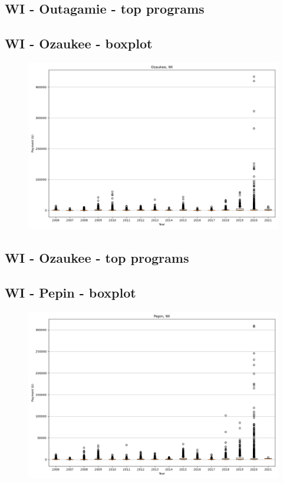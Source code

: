 \subsection*{WI - Outagamie - top programs}

\newpage
\subsection*{WI - Ozaukee - boxplot}
\begin{figure}[h]
\centering
\includegraphics[width=7in]{../output/boxplots/counties/Ozaukee-WI_boxplot.png}
\end{figure}


\subsection*{WI - Ozaukee - top programs}

\newpage
\subsection*{WI - Pepin - boxplot}
\begin{figure}[h]
\centering
\includegraphics[width=7in]{../output/boxplots/counties/Pepin-WI_boxplot.png}
\end{figure}


